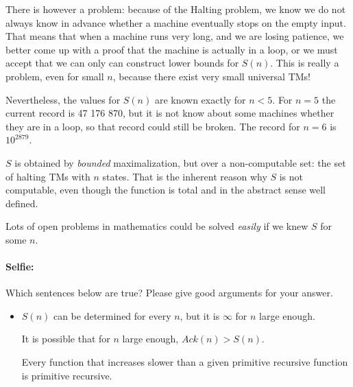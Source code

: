 There is however a problem: because of the Halting problem, we know we
do not always know in advance whether a machine eventually stops on
the empty input. That means that when a machine runs very long, and we
are losing patience, we better come up with a proof that the machine
is actually in a loop, or we must accept that we can only can
construct lower bounds for $S(n)$. This is really a problem, even for
small $n$, because there exist very small universal TMs!

Nevertheless, the values for $S(n)$ are known exactly for $n <
5$. For $n = 5$ the current record is 47 176 870, but it is not know
about some machines whether they are in a loop, so that record could
still be broken. The record for $n = 6$ is $10^{2879}$.

$S$ is obtained by {\em bounded} maximalization, but over a
non-computable set: the set of halting TMs with $n$ states. That is
the inherent reason why $S$ is not computable, even though the
function is total and in the abstract sense well defined.

Lots of open problems in mathematics could be solved {\em easily} if
we knew $S$ for some $n$.


\paragraph{Selfie:} Which sentences below are true? Please give good arguments for your answer.

\begin{itemize}
\item[] $S(n)$ can be determined for every $n$, but it is $\infty$ for
  $n$ large enough.

It is possible that for $n$ large enough, $Ack(n) > S(n)$.

Every function that increases slower than a given primitive recursive
function is primitive recursive.
\end{itemize}

